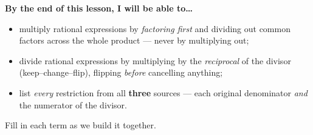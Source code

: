 \documentclass[10pt]{article}
\begin{document}
\namedateperiod

\vspace{0.08in}

\begin{objectivebox}
\textbf{By the end of this lesson, I will be able to\dots}
\begin{itemize}\setlength{\itemsep}{2pt}
  \item multiply rational expressions by \emph{factoring first} and dividing out common factors across the whole product --- never by multiplying out;
  \item divide rational expressions by multiplying by the \emph{reciprocal} of the divisor (keep--change--flip), flipping \emph{before} cancelling anything;
  \item list \emph{every} restriction from all \textbf{three} sources --- each original denominator \emph{and} the numerator of the divisor.
\end{itemize}
\end{objectivebox}

\vspace{0.05in}

\begin{vocabbox}
\small
Fill in each term as we build it together.
\par\vspace{2pt}   %
\end{vocabbox}
\end{document}
